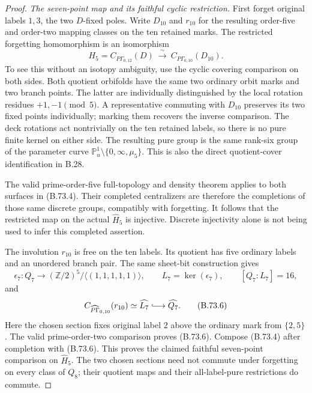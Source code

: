 \begin{proof}
\emph{The seven-point map and its faithful cyclic restriction.}
First forget original labels \(1,3\), the two \(D\)-fixed
poles.  Write \(D_{10}\) and \(r_{10}\) for the resulting
order-five and order-two mapping classes on the ten
retained marks.  The restricted forgetting homomorphism is
an isomorphism
\[
 H_5=C_{P\Gamma_{0,12}}(D)
       \ \xrightarrow{\ \sim\ }\
       C_{P\Gamma_{0,10}}(D_{10}).                              \tag{B.73.4}
\]
To see this without an isotopy ambiguity, use the cyclic
covering comparison on both sides.  Both quotient orbifolds
have the same two ordinary orbit marks and two branch
points.  The latter are individually distinguished by
the local rotation residues \(+1,-1\pmod5\).
A representative commuting with \(D_{10}\) preserves its
two fixed points individually; marking them recovers
the inverse comparison.
The deck rotations act nontrivially on the ten retained
labels, so there is no pure finite kernel on either side.
The resulting pure group is the same rank-six group of
the parameter curve
\(\mathbb P^1_u\setminus\{0,\infty,\mu_5\}\).
This is also the direct quotient-cover identification
in B.28.

The valid prime-order-five full-topology and density theorem
applies to both surfaces in (B.73.4).
Their completed centralizers are therefore the completions
of those same discrete groups, compatibly with forgetting.
It follows that the restricted map on the actual
\(\widehat H_5\) is injective.
Discrete injectivity alone is not being used to infer
this completed assertion.

The involution \(r_{10}\) is free on the ten labels.
Its quotient has five ordinary labels and an unordered
branch pair.  The same sheet-bit construction gives
\[
 \epsilon_7:Q_7\longrightarrow
       (\mathbb Z/2)^5/\langle(1,1,1,1,1)\rangle,\qquad
 L_7=\ker(\epsilon_7),\qquad [Q_7:L_7]=16,                       \tag{B.73.5}
\]
and
\[
 C_{\widehat{P\Gamma}_{0,10}}(r_{10})
          \simeq\widehat{L_7}
                 \lhook\joinrel\longrightarrow\widehat{Q_7}.
                                                               \tag{B.73.6}
\]
Here the chosen section fixes original label \(2\) above
the ordinary mark from \(\{2,5\}\).
The valid prime-order-two comparison proves (B.73.6).
Compose (B.73.4) after completion with (B.73.6).
This proves the claimed faithful seven-point comparison
on \(\widehat H_5\).
The two chosen sections need not commute under forgetting
on every class of \(Q_8\); their quotient maps and their
all-label-pure restrictions do commute.


\end{proof}

